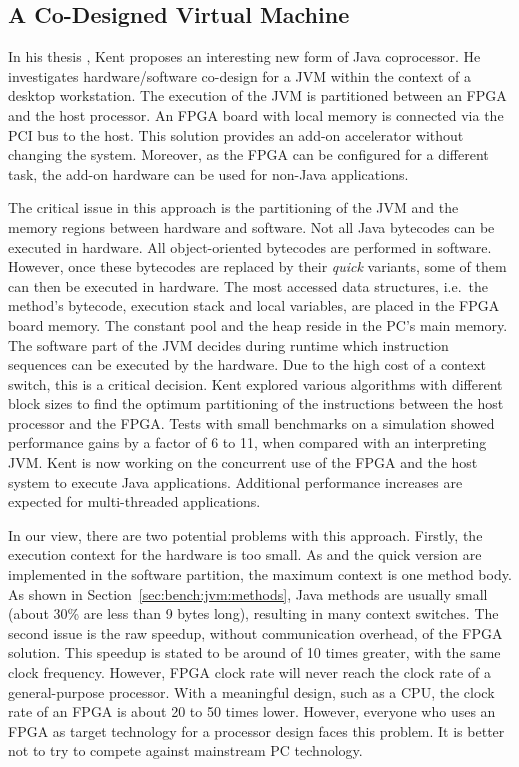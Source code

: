 \subsection{A Co-Designed Virtual Machine}

In his thesis \cite{KentPhD}, Kent proposes an interesting new form
of Java coprocessor. He investigates hardware/software co-design for
a JVM within the context of a desktop workstation. The execution of
the JVM is partitioned between an FPGA and the host processor. An
FPGA board with local memory is connected via the PCI bus to the
host. This solution provides an add-on accelerator without changing
the system. Moreover, as the FPGA can be configured for a different
task, the add-on hardware can be used for non-Java applications.

The critical issue in this approach is the partitioning of the JVM
and the memory regions between hardware and software. Not all Java
bytecodes can be executed in hardware. All object-oriented bytecodes
are performed in software. However, once these bytecodes are
replaced by their \textit{quick} variants, some of them can then be
executed in hardware. The most accessed data structures, i.e.\ the
method's bytecode, execution stack and local variables, are placed
in the FPGA board memory. The constant pool and the heap reside in
the PC's main memory. The software part of the JVM decides during
runtime which instruction sequences can be executed by the hardware.
Due to the high cost of a context switch, this is a critical
decision. Kent explored various algorithms with different block
sizes to find the optimum partitioning of the instructions between
the host processor and the FPGA. Tests with small benchmarks on a
simulation showed performance gains by a factor of 6 to 11, when
compared with an interpreting JVM. Kent is now working on the
concurrent use of the FPGA and the host system to execute Java
applications. Additional performance increases are expected for
multi-threaded applications.

In our view, there are two potential problems with this approach.
Firstly, the execution context for the hardware is too small. As
 and the quick version are implemented in the
software partition, the maximum context is one method body. As shown
in Section~\ref{sec:bench:jvm:methods}, Java methods are usually
small (about 30\% are less than 9 bytes long), resulting in many
context switches. The second issue is the raw speedup, without
communication overhead, of the FPGA solution. This speedup is stated
to be around of 10 times greater, with the same clock frequency.
However, FPGA clock rate will never reach the clock rate of a
general-purpose processor. With a meaningful design, such as a CPU,
the clock rate of an FPGA is about 20 to 50 times lower. However,
everyone who uses an FPGA as target technology for a processor
design faces this problem. It is better not to try to compete
against mainstream PC technology.

